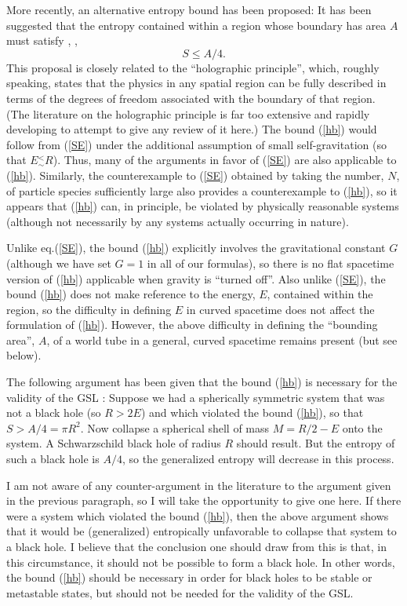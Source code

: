 \documentclass[12pt]{article}
\begin{document}
More recently, an alternative entropy bound has been proposed: It has
been suggested that the entropy contained within a region whose
boundary has area $A$ must satisfy \cite{th1}, \cite{b8}, \cite{suss}
\begin{equation}
S \leq A/4 .
\label{hb}
\end{equation}
This proposal is closely related to the ``holographic principle'',
which, roughly speaking, states that the physics in any spatial region
can be fully described in terms of the degrees of freedom associated
with the boundary of that region. (The literature on the holographic
principle is far too extensive and rapidly developing to attempt to
give any review of it here.) The bound (\ref{hb}) would follow from
(\ref{SE}) under the additional assumption of small self-gravitation
(so that $E \mathrel{{}^<_\sim} R$). Thus, many of the arguments in
favor of (\ref{SE}) are also applicable to (\ref{hb}). Similarly, the
counterexample to (\ref{SE}) obtained by taking the number, $N$, of
particle species sufficiently large also provides a counterexample to
(\ref{hb}), so it appears that (\ref{hb}) can, in principle, be
violated by physically reasonable systems (although not necessarily by
any systems actually occurring in nature).

Unlike eq.(\ref{SE}), the bound (\ref{hb}) explicitly involves the
gravitational constant $G$ (although we have set $G = 1$ in all of our
formulas), so there is no flat spacetime version of (\ref{hb})
applicable when gravity is ``turned off''. Also unlike (\ref{SE}), the
bound (\ref{hb}) does not make reference to the energy, $E$, contained
within the region, so the difficulty in defining $E$ in curved
spacetime does not affect the formulation of (\ref{hb}). However, the
above difficulty in defining the ``bounding area'', $A$, of a world
tube in a general, curved spacetime remains present (but see below).

The following argument has been given that the bound (\ref{hb}) is
necessary for the validity of the GSL \cite{suss}: Suppose we had a
spherically symmetric system that was not a black hole (so $R > 2 E$)
and which violated the bound (\ref{hb}), so that $S > A/4 = \pi R^2$. Now
collapse a spherical shell of mass $M = R/2 - E$ onto the system. A
Schwarzschild black hole of radius $R$ should result. But the entropy
of such a black hole is $A/4$, so the generalized entropy will
decrease in this process.

I am not aware of any counter-argument in the literature to the
argument given in the previous paragraph, so I will take the
opportunity to give one here. If there were a system which violated
the bound (\ref{hb}), then the above argument shows that it would be
(generalized) entropically unfavorable to collapse that system to a
black hole. I believe that the conclusion one should draw
from this is that, in this circumstance, it should not be possible to
form a black hole. In other words, the bound (\ref{hb}) should be
necessary in order for black holes to be stable or metastable states,
but should not be needed for the validity of the GSL.
\end{document}
